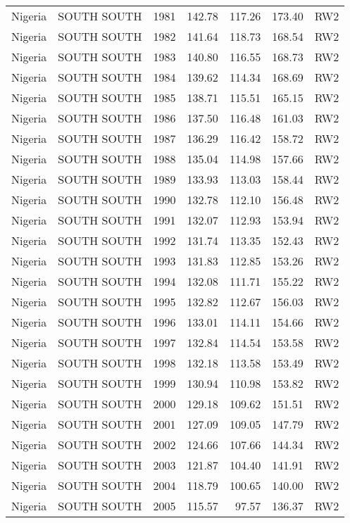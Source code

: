 \begin{longtable}{lllrrrl}
  Nigeria & SOUTH SOUTH & 1981 & 142.78 & 117.26 & 173.40 & RW2 \\ 
  Nigeria & SOUTH SOUTH & 1982 & 141.64 & 118.73 & 168.54 & RW2 \\ 
  Nigeria & SOUTH SOUTH & 1983 & 140.80 & 116.55 & 168.73 & RW2 \\ 
  Nigeria & SOUTH SOUTH & 1984 & 139.62 & 114.34 & 168.69 & RW2 \\ 
  Nigeria & SOUTH SOUTH & 1985 & 138.71 & 115.51 & 165.15 & RW2 \\ 
  Nigeria & SOUTH SOUTH & 1986 & 137.50 & 116.48 & 161.03 & RW2 \\ 
  Nigeria & SOUTH SOUTH & 1987 & 136.29 & 116.42 & 158.72 & RW2 \\ 
  Nigeria & SOUTH SOUTH & 1988 & 135.04 & 114.98 & 157.66 & RW2 \\ 
  Nigeria & SOUTH SOUTH & 1989 & 133.93 & 113.03 & 158.44 & RW2 \\ 
  Nigeria & SOUTH SOUTH & 1990 & 132.78 & 112.10 & 156.48 & RW2 \\ 
  Nigeria & SOUTH SOUTH & 1991 & 132.07 & 112.93 & 153.94 & RW2 \\ 
  Nigeria & SOUTH SOUTH & 1992 & 131.74 & 113.35 & 152.43 & RW2 \\ 
  Nigeria & SOUTH SOUTH & 1993 & 131.83 & 112.85 & 153.26 & RW2 \\ 
  Nigeria & SOUTH SOUTH & 1994 & 132.08 & 111.71 & 155.22 & RW2 \\ 
  Nigeria & SOUTH SOUTH & 1995 & 132.82 & 112.67 & 156.03 & RW2 \\ 
  Nigeria & SOUTH SOUTH & 1996 & 133.01 & 114.11 & 154.66 & RW2 \\ 
  Nigeria & SOUTH SOUTH & 1997 & 132.84 & 114.54 & 153.58 & RW2 \\ 
  Nigeria & SOUTH SOUTH & 1998 & 132.18 & 113.58 & 153.49 & RW2 \\ 
  Nigeria & SOUTH SOUTH & 1999 & 130.94 & 110.98 & 153.82 & RW2 \\ 
  Nigeria & SOUTH SOUTH & 2000 & 129.18 & 109.62 & 151.51 & RW2 \\ 
  Nigeria & SOUTH SOUTH & 2001 & 127.09 & 109.05 & 147.79 & RW2 \\ 
  Nigeria & SOUTH SOUTH & 2002 & 124.66 & 107.66 & 144.34 & RW2 \\ 
  Nigeria & SOUTH SOUTH & 2003 & 121.87 & 104.40 & 141.91 & RW2 \\ 
  Nigeria & SOUTH SOUTH & 2004 & 118.79 & 100.65 & 140.00 & RW2 \\ 
  Nigeria & SOUTH SOUTH & 2005 & 115.57 & 97.57 & 136.37 & RW2 \\ 

\end{longtable}
